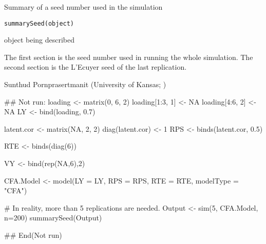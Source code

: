 \documentclass[a4paper]{book}
\begin{document}
%
\begin{Description}\relax
Summary of a seed number used in the simulation
\end{Description}
%
\begin{Usage}
\begin{verbatim}
summarySeed(object)
\end{verbatim}
\end{Usage}
%
\begin{Arguments}
\begin{ldescription}
\item[\code{object}] 
 object being described

\end{ldescription}
\end{Arguments}
%
\begin{Value}
The first section is the seed number used in running the whole simulation. The second section is the L'Ecuyer seed of the last replication.
\end{Value}
%
\begin{Author}\relax
Sunthud Pornprasertmanit (University of Kansas; )
\end{Author}
%
\begin{Examples}
\begin{ExampleCode}
## Not run: 
loading <- matrix(0, 6, 2)
loading[1:3, 1] <- NA
loading[4:6, 2] <- NA
LY <- bind(loading, 0.7)

latent.cor <- matrix(NA, 2, 2)
diag(latent.cor) <- 1
RPS <- binds(latent.cor, 0.5)

RTE <- binds(diag(6))

VY <- bind(rep(NA,6),2)

CFA.Model <- model(LY = LY, RPS = RPS, RTE = RTE, modelType = "CFA")

# In reality, more than 5 replications are needed.
Output <- sim(5, CFA.Model, n=200)
summarySeed(Output)

## End(Not run)
\end{ExampleCode}
\end{Examples}
\end{document}
